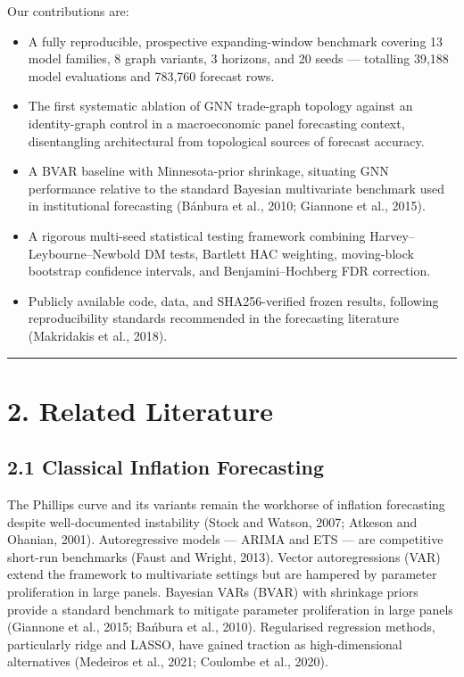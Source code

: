 \documentclass[
]{article}
\newcounter{none} %
\providecommand{\tightlist}{%
  \setlength{\itemsep}{0pt}\setlength{\parskip}{0pt}}
\begin{document}
Our contributions are:

\begin{itemize}
\tightlist
\item
  A fully reproducible, prospective expanding-window benchmark covering 13 model families, 8 graph variants, 3 horizons, and 20 seeds — totalling 39,188 model evaluations and 783,760 forecast rows.
\item
  The first systematic ablation of GNN trade-graph topology against an identity-graph control in a macroeconomic panel forecasting context, disentangling architectural from topological sources of forecast accuracy.
\item
  A BVAR baseline with Minnesota-prior shrinkage, situating GNN performance relative to the standard Bayesian multivariate benchmark used in institutional forecasting (Bánbura et al., 2010; Giannone et al., 2015).
\item
  A rigorous multi-seed statistical testing framework combining Harvey–Leybourne–Newbold DM tests, Bartlett HAC weighting, moving-block bootstrap confidence intervals, and Benjamini–Hochberg FDR correction.
\item
  Publicly available code, data, and SHA256-verified frozen results, following reproducibility standards recommended in the forecasting literature (Makridakis et al., 2018).
\end{itemize}

\begin{center}\rule{0.5\linewidth}{0.5pt}\end{center}

\section{2. Related Literature}\label{related-literature}

\subsection{2.1 Classical Inflation
Forecasting}\label{classical-inflation-forecasting}

The Phillips curve and its variants remain the workhorse of inflation
forecasting despite well-documented instability (Stock and Watson,
2007; Atkeson and Ohanian, 2001). Autoregressive models --- ARIMA and ETS --- are competitive
short-run benchmarks (Faust and Wright, 2013). Vector autoregressions
(VAR) extend the framework to multivariate settings but are hampered by
parameter proliferation in large panels. Bayesian VARs (BVAR) with shrinkage priors provide a standard benchmark to mitigate parameter proliferation in large panels (Giannone et al., 2015; Ba\'nbura et al., 2010). Regularised regression methods,
particularly ridge and LASSO, have gained traction as high-dimensional
alternatives (Medeiros et al., 2021; Coulombe et al., 2020).
\end{document}
